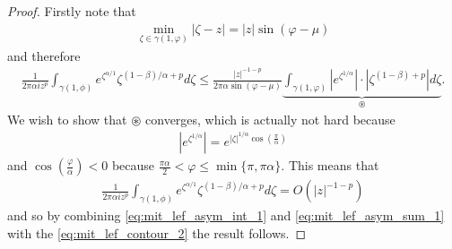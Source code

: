 \begin{proof}
    Firstly note that
    \begin{align*}
        \min_{\zeta \in \gamma(1, \varphi)} |\zeta - z| = |z|\sin(\varphi - \mu)
    \end{align*}
    and therefore
    \begin{align}
        \label{eq:mit_lef_contour_int_conv}
        \frac{1}{2\pi\alpha i z^p} \int_{\gamma(1,\phi)} e^{\zeta^{\alpha / 1}} \zeta^{(1-\beta)/\alpha + p} d\zeta \leq \frac{|z|^{-1-p}}{2\pi\alpha\sin(\varphi - \mu)} \underbrace{\int_{\gamma(1,\varphi)} \left| e^{\zeta^{1/\alpha}} \right| \cdot \left| \zeta^{(1-\beta)+p}\right| d\zeta}_{\circledast}.
    \end{align}
We wish to show that $ \circledast $ converges, which is actually not hard because 
\begin{align*}
    \left| e^{\zeta^{1/\alpha}}\right| = e^{|\zeta|^{1/\alpha} \cos\left(\frac{\pi}{\alpha}\right)}
\end{align*}
and $ \cos\left(\frac{\varphi}{\alpha}\right) < 0 $ because $ \frac{\pi \alpha}{2} < \varphi \leq \min\{\pi, \pi \alpha\} $. 
This means that 
\begin{align}
    \label{eq:mit_lef_asym_int_1}
    \frac{1}{2\pi\alpha i z^p} \int_{\gamma(1,\phi)} e^{\zeta^{\alpha / 1}} \zeta^{(1-\beta)/\alpha + p} d\zeta = O(|z|^{-1-p})
\end{align}
and so by combining \eqref{eq:mit_lef_asym_int_1} and \eqref{eq:mit_lef_asym_sum_1} with the \eqref{eq:mit_lef_contour_2} the result follows.
\end{proof}

\clearpage
